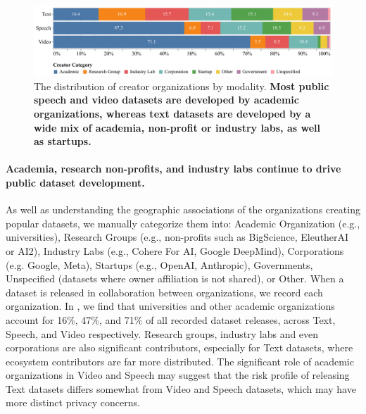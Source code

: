 \begin{figure}[!htb]
    \centering
    \includegraphics[width=\textwidth]{figures/creator_categories_by_modality.pdf}
    \caption{The distribution of creator organizations by modality. \textbf{Most public speech and video datasets are developed by academic organizations, whereas text datasets are developed by a wide mix of academia, non-profit or industry labs, as well as startups.} 
    }
    \label{fig:creator-orgs}
    \vspace{-3mm}
\end{figure}

\vspace{-2mm}
\paragraph{Academia, research non-profits, and industry labs continue to drive public dataset development.}
As well as understanding the geographic associations of the organizations creating popular datasets, we manually categorize them into: Academic Organization (e.g., universities), Research Groups (e.g., non-profits such as BigScience, EleutherAI or AI2), Industry Labs (e.g., Cohere For AI, Google DeepMind), Corporations (e.g. Google, Meta), Startups (e.g., OpenAI, Anthropic), Governments, Unspecified (datasets where owner affiliation is not shared), or Other.
When a dataset is released in collaboration between organizations, we record each organization.
In , we find that universities and other academic organizations account for 16\%, 47\%, and 71\% of all recorded dataset releases, across Text, Speech, and Video respectively.
Research groups, industry labs and even corporations are also significant contributors, especially for Text datasets, where ecosystem contributors are far more distributed.
The significant role of academic organizations in Video and Speech may suggest that the risk profile of releasing Text datasets differs somewhat from Video and Speech datasets, which may have more distinct privacy concerns.